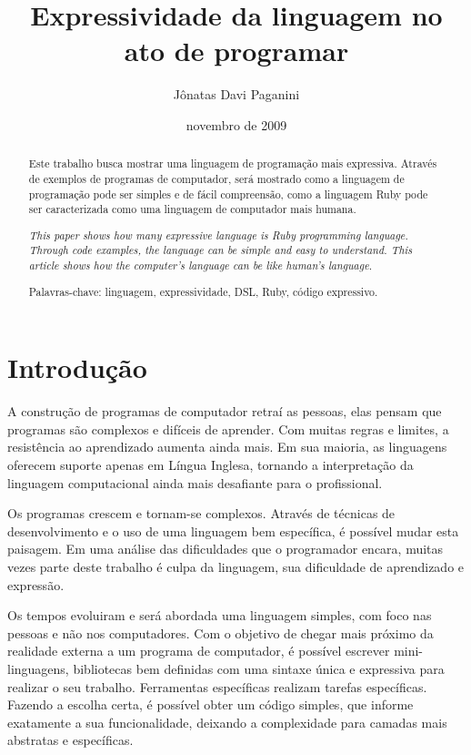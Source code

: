 \documentclass[espaco=simples,appendix=Name]{abnt}
\title{Expressividade da linguagem no ato de programar}
\author{Jônatas Davi Paganini}
\date{novembro de 2009}
\begin{document}
\maketitle
\begin{abstract}
Este trabalho busca mostrar uma linguagem de programação mais expressiva. Através de exemplos de programas de computador, será mostrado como a linguagem de programação pode ser simples e de fácil compreensão, como a linguagem Ruby pode ser caracterizada como uma linguagem de computador mais humana.

\textit{This paper shows how many expressive language is Ruby programming language. Through code examples, the language can be simple and easy to understand. This article shows how the computer's language can be like human's language.}

Palavras-chave: linguagem, expressividade, DSL, Ruby, código expressivo.
\end{abstract}


\chapter{Introdução}

A construção de programas de computador retraí as pessoas, elas pensam que programas são complexos e difíceis de aprender. Com muitas regras e limites, a resistência ao aprendizado aumenta ainda mais. Em sua maioria, as linguagens oferecem suporte apenas em Língua Inglesa, tornando a interpretação da linguagem computacional ainda mais desafiante para o profissional. 

Os programas crescem e tornam-se complexos. Através de técnicas de desenvolvimento e o uso de uma linguagem bem específica, é possível mudar esta paisagem. Em uma análise das dificuldades que o programador encara, muitas vezes parte deste trabalho é culpa da linguagem, sua dificuldade de aprendizado e expressão.

Os tempos evoluiram e será abordada uma linguagem simples, com foco nas pessoas e não nos computadores. Com o objetivo de chegar mais próximo da realidade externa a um programa de computador, é possível escrever mini-linguagens, bibliotecas bem definidas com uma sintaxe única e expressiva para realizar o seu trabalho. Ferramentas específicas realizam tarefas específicas. Fazendo a escolha certa, é possível obter um código simples, que informe exatamente a sua funcionalidade, deixando a complexidade para camadas mais abstratas e específicas.  
\end{document}
